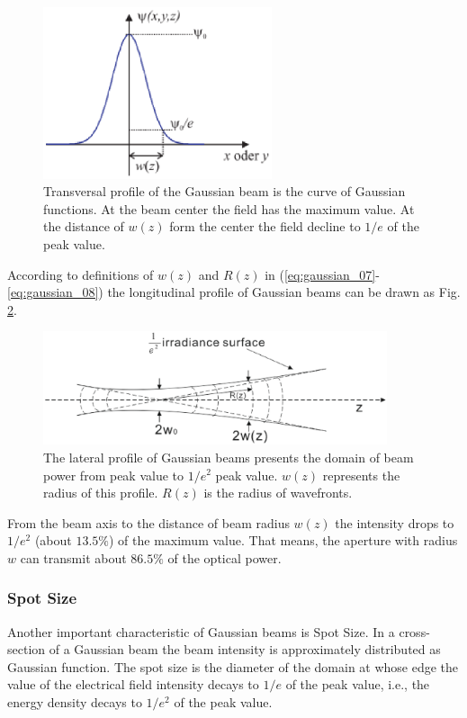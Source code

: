 \begin{figure}[!ht]
\centering
\includegraphics[width=0.6\textwidth]{bilder/gussian_verteilung}
\caption{Transversal profile of the Gaussian beam is the curve of Gaussian functions. At the beam center the field has the maximum value. At the distance of $w(z)$ form the center the field decline to $1/e$ of the peak value.}
\label{fig:gaussian_verteilung}
\end{figure}
According to definitions of $w(z)$ and $R(z)$ in (\ref{eq:gaussian_07}-\ref{eq:gaussian_08}) the longitudinal profile of Gaussian beams can be drawn as Fig. \ref{fig:gussian_profile}.
\begin{figure}[!ht]
\centering
\includegraphics[width=0.9\textwidth]{bilder/gussian_profile}
\caption{The lateral profile of Gaussian beams presents the domain of beam power from peak value to $1/e^2$ peak value. $w(z)$ represents the radius of this profile. $R(z)$ is the radius of wavefronts.}
\label{fig:gussian_profile}
\end{figure}
From the beam axis to the distance of beam radius $w(z)$ the intensity drops to $1/e^{2}$ (about $ 13.5\%$) of the maximum value. That means, the aperture with radius $w$ can transmit about $86.5\%$ of the optical power.

\subsubsection*{Spot Size}
Another important characteristic of Gaussian beams is Spot Size. In a cross-section of a Gaussian beam the beam intensity is approximately distributed as Gaussian function. The spot size is the diameter of the domain at whose edge the value of the electrical field intensity decays to $1/e$ of the peak value, i.e., the energy density decays to $1/e^2$ of the peak value.
